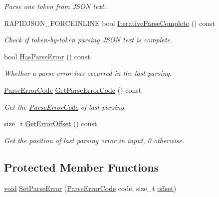 \begin{DoxyCompactItemize}
\begin{DoxyCompactList}\small\item\em Parse one token from J\+S\+ON text. \end{DoxyCompactList}\item 
R\+A\+P\+I\+D\+J\+S\+O\+N\+\_\+\+F\+O\+R\+C\+E\+I\+N\+L\+I\+NE bool \hyperlink{classGenericReader_aa1e9e1eef614fde971550ed2f955151d}{Iterative\+Parse\+Complete} () const
\begin{DoxyCompactList}\small\item\em Check if token-\/by-\/token parsing J\+S\+ON text is complete. \end{DoxyCompactList}\item 
bool \hyperlink{classGenericReader_ac417441794477ea747b63adb6d3653a9}{Has\+Parse\+Error} () const
\begin{DoxyCompactList}\small\item\em Whether a parse error has occurred in the last parsing. \end{DoxyCompactList}\item 
\hyperlink{group__RAPIDJSON__ERRORS_ga8d4b32dfc45840bca189ade2bbcb6ba7}{Parse\+Error\+Code} \hyperlink{classGenericReader_a937bf90919f50e1c370b312cee5833e8}{Get\+Parse\+Error\+Code} () const
\begin{DoxyCompactList}\small\item\em Get the \hyperlink{group__RAPIDJSON__ERRORS_ga8d4b32dfc45840bca189ade2bbcb6ba7}{Parse\+Error\+Code} of last parsing. \end{DoxyCompactList}\item 
size\+\_\+t \hyperlink{classGenericReader_ae9008523ccd06d839a57335835cb4091}{Get\+Error\+Offset} () const
\begin{DoxyCompactList}\small\item\em Get the position of last parsing error in input, 0 otherwise. \end{DoxyCompactList}\end{DoxyCompactItemize}
\subsection*{Protected Member Functions}
\begin{DoxyCompactItemize}
\item 
\hyperlink{imgui__impl__opengl3__loader_8h_ac668e7cffd9e2e9cfee428b9b2f34fa7}{void} \hyperlink{classGenericReader_ae50079444295bf109730c3b708a818a6}{Set\+Parse\+Error} (\hyperlink{group__RAPIDJSON__ERRORS_ga8d4b32dfc45840bca189ade2bbcb6ba7}{Parse\+Error\+Code} code, size\+\_\+t \hyperlink{imgui__impl__opengl3__loader_8h_ae1b92ae085ddef4b1cdca7d749339fb0}{offset})
\end{DoxyCompactItemize}
